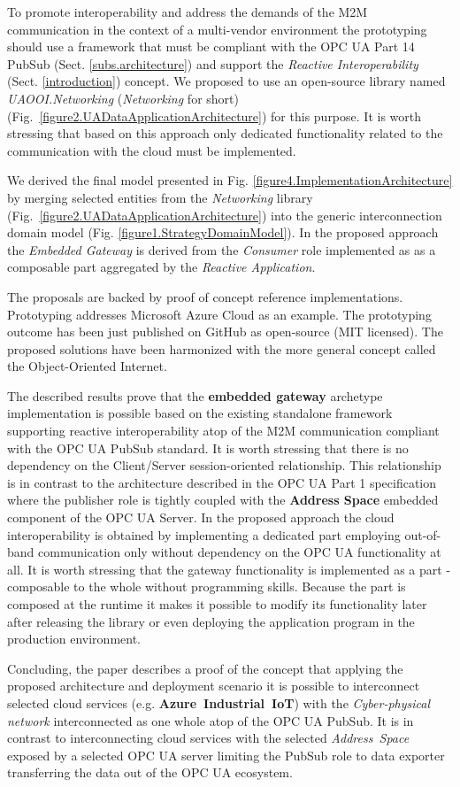 \documentclass{jacsart}
\begin{document}
To promote interoperability and address the demands of the M2M communication in the context of a multi-vendor environment the prototyping should use a framework that must be compliant with the OPC UA Part 14 PubSub (Sect. \ref*{subs.architecture}) and support the \emph{Reactive Interoperability} (Sect. \ref*{introduction}) concept. We proposed to use an open-source library named \emph{UAOOI.Networking} (\emph{Networking} for short) (Fig.~\ref*{figure2.UADataApplicationArchitecture}) for this purpose. It is worth stressing that based on this approach only dedicated functionality related to the communication with the cloud must be implemented.

We derived the final model presented in Fig. \ref*{figure4.ImplementationArchitecture} by merging selected entities from the \emph{Networking} library (Fig.~\ref*{figure2.UADataApplicationArchitecture}) into the generic interconnection domain model (Fig. \ref*{figure1.StrategyDomainModel}). In the proposed approach the \textit{Embedded Gateway} is derived from the \textit{Consumer} role implemented as as a composable part aggregated by the \textit{Reactive Application}.

The proposals are backed by proof of concept reference implementations. Prototyping addresses Microsoft Azure Cloud as an example. The prototyping outcome has been just published on GitHub as open-source (MIT licensed). The proposed solutions have been harmonized with the more general concept called the Object-Oriented Internet.

The described results prove that the \textbf{embedded gateway} archetype implementation is possible based on the existing standalone framework supporting reactive interoperability atop of the M2M communication compliant with the OPC UA PubSub standard. It is worth stressing that there is no dependency on the Client/Server session-oriented relationship. This relationship is in contrast to the architecture described in the OPC UA Part 1 \cite{OPCUAPart1} specification where the publisher role is tightly coupled with the \textbf{Address Space} embedded component of the OPC UA Server. In the proposed approach the cloud interoperability is obtained by implementing a dedicated part employing out-of-band communication only without dependency on the OPC UA functionality at all. It is worth stressing that the gateway functionality is implemented as a part - composable to the whole without programming skills. Because the part is composed at the runtime it makes it possible to modify its functionality later after releasing the library or even deploying the application program in the production environment.

Concluding, the paper describes a proof of the concept that applying the proposed architecture and deployment scenario it is possible to interconnect selected cloud services (e.g. \textbf{Azure\ Industrial\ IoT}) with the \emph{Cyber-physical network} interconnected as one whole atop of the OPC UA PubSub. It is in contrast to interconnecting cloud services with the selected \emph{ Address\ Space} exposed by a selected OPC UA server limiting the PubSub role to data exporter transferring the data out of the OPC UA ecosystem.



\end{document}
